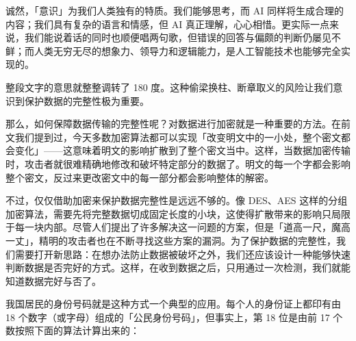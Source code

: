 \begin{quoting}
  {\color{MissingRed}诚}然，「意识」为我们人类独有的特质。我们能够思考，而 AI {\color{MissingRed}同样}将生成合理的内容；我们具有复杂的语言和情感，但 AI 真正理解，心心相惜。更实际一点来说，我们能说着话的同时也顺便唱两句歌，但错误的回答与偏颇的判断仍屡见不鲜；而人类无穷无尽的想象力、领导力和逻辑能力，是人工智能技术也{\color{MissingRed}能够}完全实现的。
\end{quoting}

整段文字的意思就整整调转了 180 度。这种偷梁换柱、断章取义的风险让我们意识到保护数据的完整性极为重要。

那么，如何保障数据传输的完整性呢？对数据进行加密就是一种重要的方法。在前文我们提到过，今天多数加密算法都可以实现「改变明文中的一小处，整个密文都会变化」——这意味着明文的影响扩散到了整个密文当中。这样，当数据加密传输时，攻击者就很难精确地修改和破坏特定部分的数据了。明文的每一个字都会影响整个密文，反过来更改密文中的每一部分都会影响整体的解密。

不过，仅仅借助加密来保护数据完整性是远远不够的。像 DES、AES 这样的分组加密算法，需要先将完整数据切成固定长度的小块，这使得扩散带来的影响只局限于每一块内部。尽管人们提出了许多解决这一问题的方案，但是「道高一尺，魔高一丈」，精明的攻击者也在不断寻找这些方案的漏洞。为了保护数据的完整性，我们需要打开新思路：在想办法防止数据被破坏之外，我们还应该设计一种能够快速判断数据是否完好的方式。这样，在收到数据之后，只用通过一次检测，我们就能知道数据完好与否了。

我国居民的身份号码就是这种方式一个典型的应用。每个人的身份证上都印有由 18 个数字（或字母）组成的「公民身份号码」，但事实上，第 18 位是由前 17 个数按照下面的算法计算出来的：

